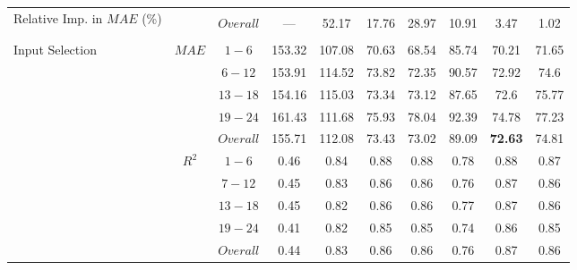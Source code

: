 \begin{table}[h]
\begin{center}
\begin{tabular}{@{}p{5.3em}ccccccccc@{}}
    \midrule
    \multirow{3}{5em}{Relative Imp. in $MAE$ (\%)} & & & & & & & & & \\
    & & $Overall$ & --- & 52.17 & 17.76 & 28.97 & 10.91 & 3.47 & 1.02 \\ 
    & & & & & & & & & \\
    \midrule
    \multirow{10}{5em}{Input Selection}
                                              & \multirow{5}{*}{$MAE$} & $1 - 6$ & 153.32 & 107.08 & 70.63 & 68.54 & 85.74 & 70.21 & 71.65 \\
                                              &                   & $6 - 12$ & 153.91 & 114.52 & 73.82 & 72.35 & 90.57 & 72.92 & 74.6 \\
                                              &                   & $13 - 18$ & 154.16 & 115.03 & 73.34 & 73.12 & 87.65 & 72.6 & 75.77 \\
                                              &                   & $19 - 24$ & 161.43 & 111.68 & 75.93 & 78.04 & 92.39 & 74.78 & 77.23 \\
                                              &                   & $Overall$ & 155.71 & 112.08 & 73.43 & 73.02 & 89.09 & \textbf{72.63} & 74.81 \\ \cmidrule(lr){2-10}
                                              & \multirow{5}{*}{$R^2$} & $1 - 6$ & 0.46 & 0.84 & 0.88 & 0.88 & 0.78 & 0.88 & 0.87 \\
                                              &                   & $7 - 12$ & 0.45 & 0.83 & 0.86 & 0.86 & 0.76 & 0.87 & 0.86 \\
                                              &                   & $13 - 18$ & 0.45 & 0.82 & 0.86 & 0.86 & 0.77 & 0.87 & 0.86 \\
                                              &                   & $19 - 24$ & 0.41 & 0.82 & 0.85 & 0.85 & 0.74 & 0.86 & 0.85 \\
                                              &                   & $Overall$ & 0.44 & 0.83 & 0.86 & 0.86 & 0.76 & 0.87 & 0.86 \\ 
    \bottomrule
    \end{tabular}
\end{center}
\end{table}

